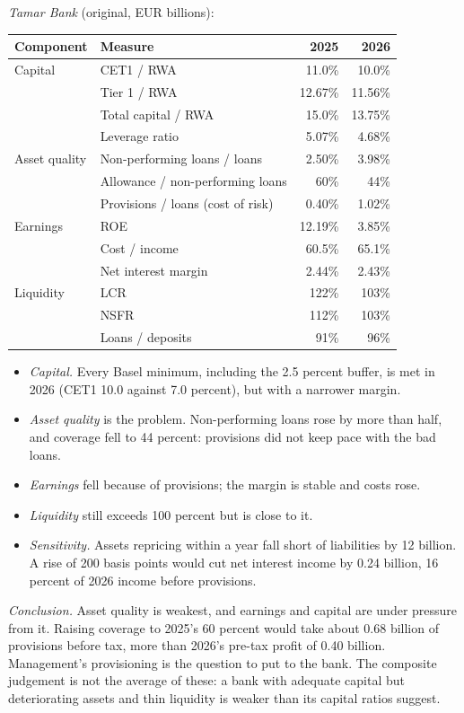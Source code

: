 \begin{qfmethod}
 \emph{Tamar Bank} (original, EUR billions):
\begin{center}\small
\begin{tabular}{@{}llrr@{}}
\toprule
Component & Measure & 2025 & 2026 \\
\midrule
Capital & CET1 / RWA & 11.0\% & 10.0\% \\
 & Tier 1 / RWA & 12.67\% & 11.56\% \\
 & Total capital / RWA & 15.0\% & 13.75\% \\
 & Leverage ratio & 5.07\% & 4.68\% \\
Asset quality & Non-performing loans / loans & 2.50\% & 3.98\% \\
 & Allowance / non-performing loans & 60\% & 44\% \\
 & Provisions / loans (cost of risk) & 0.40\% & 1.02\% \\
Earnings & ROE & 12.19\% & 3.85\% \\
 & Cost / income & 60.5\% & 65.1\% \\
 & Net interest margin & 2.44\% & 2.43\% \\
Liquidity & LCR & 122\% & 103\% \\
 & NSFR & 112\% & 103\% \\
 & Loans / deposits & 91\% & 96\% \\
\bottomrule
\end{tabular}
\end{center}
\begin{itemize}
\item \emph{Capital.} Every Basel minimum, including the 2.5 percent buffer, is met in 2026 (CET1 10.0 against 7.0 percent), but with a narrower margin.
\item \emph{Asset quality} is the problem. Non-performing loans rose by more than half, and coverage fell to 44 percent: provisions did not keep pace with the bad loans.
\item \emph{Earnings} fell because of provisions; the margin is stable and costs rose.
\item \emph{Liquidity} still exceeds 100 percent but is close to it.
\item \emph{Sensitivity.} Assets repricing within a year fall short of liabilities by 12 billion. A rise of 200 basis points would cut net interest income by 0.24 billion, 16 percent of 2026 income before provisions.
\end{itemize}
\emph{Conclusion.} Asset quality is weakest, and earnings and capital are under pressure from it. Raising coverage to 2025's 60 percent would take about 0.68 billion of provisions before tax, more than 2026's pre-tax profit of 0.40 billion. Management's provisioning is the question to put to the bank. The composite judgement is not the average of these: a bank with adequate capital but deteriorating assets and thin liquidity is weaker than its capital ratios suggest.


\end{qfmethod}
